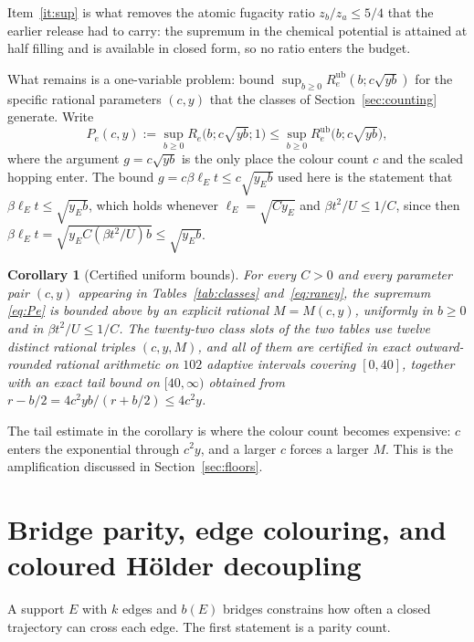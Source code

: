 \documentclass[11pt]{article}
\theoremstyle{plain}
\newtheorem{corollary}{Corollary}
\theoremstyle{definition}
\begin{document}
Item~\ref{it:sup} is what removes the atomic fugacity ratio $z_b/z_a\le5/4$ that the
earlier release had to carry: the supremum in the chemical potential is attained at
half filling and is available in closed form, so no ratio enters the budget.

What remains is a one-variable problem: bound
$\sup_{b\ge0}R_e^{\mathrm{ub}}(b;c\sqrt{yb})$ for the specific rational parameters
$(c,y)$ that the classes of Section~\ref{sec:counting} generate. Write
\begin{equation}\label{eq:Pe}
P_e(c,y):=\sup_{b\ge0}R_e\bigl(b;c\sqrt{yb};1\bigr)\le\sup_{b\ge0}
R_e^{\mathrm{ub}}\bigl(b;c\sqrt{yb}\bigr),
\end{equation}
where the argument $g=c\sqrt{yb}$ is the only place the colour count $c$ and the
scaled hopping enter. The bound $g=c\beta\ell_Et\le c\sqrt{y_E b}$ used here is the
statement that $\beta\ell_Et\le\sqrt{y_E b}$, which holds whenever $\ell_E=\sqrt{Cy_E}$ and
$\beta t^{2}/U\le1/C$, since then
$\beta\ell_Et=\sqrt{y_EC(\beta t^{2}/U)b}\le\sqrt{y_Eb}$.

\begin{corollary}[Certified uniform bounds]\label{cor:pe}
For every $C>0$ and every parameter pair $(c,y)$ appearing in
Tables~\ref{tab:classes} and~\eqref{eq:raney}, the supremum \eqref{eq:Pe} is
bounded above by an explicit rational $M=M(c,y)$, uniformly in $b\ge0$ and in
$\beta t^{2}/U\le1/C$. The twenty-two class slots of the two tables use twelve
distinct rational triples $(c,y,M)$, and all of them are certified in exact
outward-rounded rational arithmetic on $102$ adaptive
intervals covering $[0,40]$, together with an exact tail bound on $[40,\infty)$
obtained from $r-b/2=4c^{2}yb/(r+b/2)\le4c^{2}y$.
\end{corollary}

The tail estimate in the corollary is where the colour count becomes expensive:
$c$ enters the exponential through $c^{2}y$, and a larger $c$ forces a larger
$M$. This is the amplification discussed in Section~\ref{sec:floors}.

\section{Bridge parity, edge colouring, and coloured H\"older decoupling}
\label{sec:colour}

A support $E$ with $k$ edges and $b(E)$ bridges constrains how often a closed
trajectory can cross each edge. The first statement is a parity count.
\end{document}
